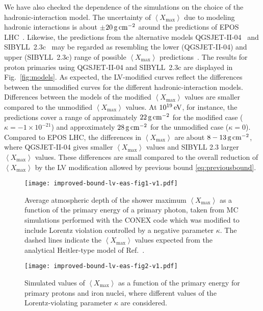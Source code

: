\documentclass[aps,prd,preprint,longbibliography]{revtex4-1}
\begin{document}
We have also checked the dependence of the simulations
on the choice of the hadronic-interaction model.
The uncertainty of $\left<X_\text{max}\right>$ due to modeling
hadronic interactions is about $\pm$$\unit[20]{g\,cm^{-2}}$
around the predictions of EPOS LHC~\cite{Pierog2017}. Likewise,
the predictions from the alternative models
QGSJET-II-04~\cite{Ostapchenko2011} and
SIBYLL~2.3c~\cite{AhnEngelGaisserLipariStanev2009,RiehnEngelFedynitchGaisserStanev2015,RiehnDembinskiEngelFedynitchGaisserStanev2015} may be regarded as resembling the lower (QGSJET-II-04) and upper (SIBYLL~2.3c)
range of possible $\left<X_\text{max}\right>$ predictions~\cite{Pierog2017}.
The results for proton primaries using QGSJET-II-04 and SIBYLL~2.3c
are displayed in Fig.~\ref{fig:models}.
As expected, the LV-modified curves reflect the differences between the
unmodified curves for the different hadronic-interaction models.
Differences between the models of the modified $\left<X_\text{max}\right>$
values are smaller compared to the unmodified $\left<X_\text{max}\right>$ values.
At $\unit[10^{19}]{eV}$, for instance, the predictions cover a range of
approximately $\unit[22]{g\,cm^{-2}}$ for the modified  case
($\kappa= -1 \times 10^{-21}$)
and approximately $\unit[28]{g\,cm^{-2}}$
for the unmodified case ($\kappa=0$).
Compared to EPOS LHC, the differences in
$\left<X_\text{max}\right>$ are about $\unit[8-13]{g\,cm^{-2}}$,
where QGSJET-II-04 gives smaller
$\left<X_\text{max}\right>$ values
and SIBYLL 2.3 larger $\left<X_\text{max}\right>$ values.
These differences are small compared
to the overall reduction of $\left<X_\text{max}\right>$ by the LV modification allowed
by previous bound \eqref{eq:previousbound}.


\begin{figure}[p]  %
\centering
\texttt{[image: improved-bound-lv-eas-fig1-v1.pdf]}
\caption{Average atmospheric depth of the shower
maximum $\left<X_\text{max}\right>$ as a function of the primary energy of
a primary photon, taken from MC simulations performed with the
CONEX code which was modified to include Lorentz violation
controlled by a negative parameter $\kappa$.
The dashed lines indicate the
$\left<X_\text{max}\right>$ values
expected from the analytical Heitler-type
model of Ref.~\cite{DiazKlinkhamerRisse2016}.}
\label{fig:photons}%
\vspace*{5mm}
\centering
\texttt{[image: improved-bound-lv-eas-fig2-v1.pdf]}
\caption{Simulated values of
$\left<X_\text{max}\right>$ as a function of the primary
energy for primary protons and iron nuclei, where
different values of the Lorentz-violating parameter $\kappa$
are considered.}
\label{fig:hadrons}%
\end{figure}
\end{document}
